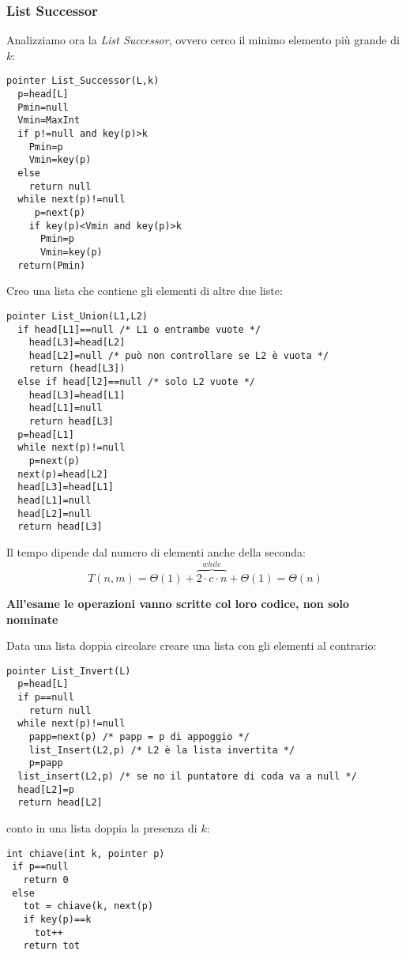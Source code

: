 \documentclass[a4paper,12pt,oneside,tikz]{book}
\begin{document}
\subsubsection{List Successor}
Analizziamo ora la \textit{List Successor}, ovvero cerco il minimo elemento più grande di $k$:
\begin{verbatim}
pointer List_Successor(L,k)
  p=head[L]
  Pmin=null
  Vmin=MaxInt
  if p!=null and key(p)>k
    Pmin=p
    Vmin=key(p)
  else
    return null
  while next(p)!=null
     p=next(p)
    if key(p)<Vmin and key(p)>k
      Pmin=p
      Vmin=key(p)
  return(Pmin)
\end{verbatim}
\begin{esercizio}
Creo una lista che contiene gli elementi di altre due liste:
\begin{verbatim}
pointer List_Union(L1,L2)
  if head[L1]==null /* L1 o entrambe vuote */
    head[L3]=head[L2]
    head[L2]=null /* può non controllare se L2 è vuota */
    return (head[L3])
  else if head[l2]==null /* solo L2 vuote */ 
    head[L3]=head[L1]
    head[L1]=null
    return head[L3]
  p=head[L1]
  while next(p)!=null
    p=next(p)
  next(p)=head[L2]
  head[L3]=head[L1]
  head[L1]=null
  head[L2]=null
  return head[L3]
\end{verbatim}
Il tempo dipende dal numero di elementi anche della seconda: $$T(n,m)=\Theta(1)+\overbrace{2\cdot c\cdot n}^{while}+\Theta(1)=\Theta(n)$$
\end{esercizio}
\textbf{All'esame le operazioni vanno scritte col loro codice, non solo nominate}
\begin{esercizio}

Data una lista doppia circolare creare una lista con gli elementi al contrario:
\begin{verbatim}
pointer List_Invert(L)
  p=head[L]
  if p==null
    return null
  while next(p)!=null
    papp=next(p) /* papp = p di appoggio */ 
    list_Insert(L2,p) /* L2 è la lista invertita */
    p=papp
  list_insert(L2,p) /* se no il puntatore di coda va a null */
  head[L2]=p
  return head[L2]
\end{verbatim}
\end{esercizio}
\begin{esercizio}
conto in una lista doppia la presenza di $k$:
\begin{verbatim}
int chiave(int k, pointer p)
 if p==null
   return 0
 else
   tot = chiave(k, next(p)
   if key(p)==k
     tot++
   return tot
\end{verbatim}
\end{esercizio}
\newpage
\end{document}
